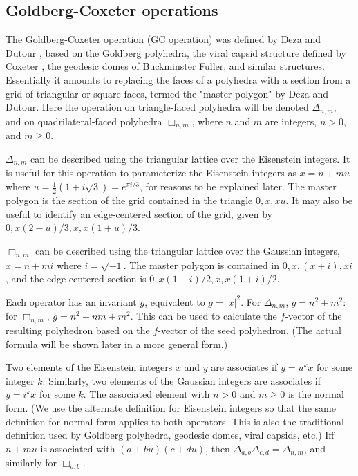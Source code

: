 \documentclass{amsart}[12pt]
\begin{document}
\subsection{Goldberg-Coxeter operations}
The Goldberg-Coxeter operation (GC operation) was defined by Deza and Dutour
\cite{dutour}, based on the Goldberg polyhedra, the viral capsid structure
defined by Coxeter \cite{coxeter71}, the geodesic domes of Buckminster Fuller,
and similar structures. Essentially it amounts to replacing the faces of a
polyhedra with a section from a grid of triangular or square faces, termed the
"master polygon" by Deza and Dutour. Here the operation on triangle-faced
polyhedra will be denoted $\Delta_{n,m}$, and on quadrilateral-faced polyhedra
$\Box_{n,m}$, where $n$ and $m$ are integers, $n > 0$, and $m \ge 0$.

$\Delta_{n,m}$ can be described using the triangular lattice over the
Eisenstein integers. It is useful for this operation to parameterize the
Eisenstein integers as $x = n + mu$ where $u = \frac{1}{2}(1 + i\sqrt 3) =
e^{\pi i/3}$, for reasons to be explained later. The master polygon is the
section of the grid contained in the triangle $0, x, xu$. It may also be useful
to identify an edge-centered section of the grid,
given by $0, x(2-u)/3, x, x(1+u)/3$.

$\Box_{n,m}$ can be described using the triangular lattice over the Gaussian
integers, $x = n + mi$ where $i = \sqrt{-1}$. The master polygon is contained
in $0,x,(x+i),xi$, and the edge-centered section is $0, x(1-i)/2, x, x(1+i)/2$.

Each operator has an invariant $g$, equivalent to $g = |x|^2$. For
$\Delta_{n,m}$, $g = n^2 + m^2$: for $\Box_{n,m}$, $g = n^2 + nm + m^2$. This
can be used to calculate the $f$-vector of the resulting polyhedron
based on the $f$-vector of the seed polyhedron. (The actual formula
will be shown later in a more general form.)

Two elements of the Eisenstein integers $x$ and $y$ are associates if
$y = u^k x$ for some integer $k$. Similarly, two elements of the Gaussian integers are
associates if $y = i^k x$ for some $k$. The associated element with $n>0$ and
$m\ge 0$ is the normal form. (We use the alternate definition for Eisenstein
integers so that the same definition for normal form applies to both operators.
This is also the traditional definition used by Goldberg polyhedra, geodesic
domes, viral capsids, etc.) Iff $n+mu$ is associated with $(a+bu)(c+du)$, then
$\Delta_{a,b}\Delta_{c,d} = \Delta_{n,m}$, and similarly for $\Box_{a,b}$.
\end{document}
